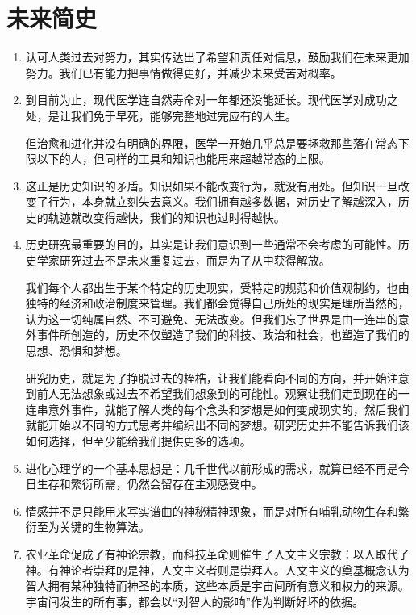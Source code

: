 \documentclass[UTF8]{ctexart}
\begin{document}
	\newpage
	
	\section{未来简史}
		
		\begin{enumerate}
			\item 认可人类过去对努力，其实传达出了希望和责任对信息，鼓励我们在未来更加努力。我们已有能力把事情做得更好，并减少未来受苦对概率。
			
			\item 到目前为止，现代医学连自然寿命对一年都还没能延长。现代医学对成功之处，是让我们免于早死，能够完整地过完应有的人生。
			
			但治愈和进化并没有明确的界限，医学一开始几乎总是要拯救那些落在常态下限以下的人，但同样的工具和知识也能用来超越常态的上限。
			
			\item  这正是历史知识的矛盾。知识如果不能改变行为，就没有用处。但知识一旦改变了行为，本身就立刻失去意义。我们拥有越多数据，对历史了解越深入，历史的轨迹就改变得越快，我们的知识也过时得越快。
			
			\item  历史研究最重要的目的，其实是让我们意识到一些通常不会考虑的可能性。历史学家研究过去不是未来重复过去，而是为了从中获得解放。
			
			我们每个人都出生于某个特定的历史现实，受特定的规范和价值观制约，也由独特的经济和政治制度来管理。我们都会觉得自己所处的现实是理所当然的，认为这一切纯属自然、不可避免、无法改变。但我们忘了世界是由一连串的意外事件所创造的，历史不仅塑造了我们的科技、政治和社会，也塑造了我们的思想、恐惧和梦想。
			
			研究历史，就是为了挣脱过去的桎梏，让我们能看向不同的方向，并开始注意到前人无法想象或过去不希望我们想象到的可能性。观察让我们走到现在的一连串意外事件，就能了解人类的每个念头和梦想是如何变成现实的，然后我们就能开始以不同的方式思考并编织出不同的梦想。研究历史并不能告诉我们该如何选择，但至少能给我们提供更多的选项。
			
			
			\item  进化心理学的一个基本思想是：几千世代以前形成的需求，就算已经不再是今日生存和繁衍所需，仍然会留存在主观感受中。
			
			\item  情感并不是只能用来写实谱曲的神秘精神现象，而是对所有哺乳动物生存和繁衍至为关键的生物算法。
			
			\item  农业革命促成了有神论宗教，而科技革命则催生了人文主义宗教：以人取代了神。有神论者崇拜的是神，人文主义者则是崇拜人。人文主义的奠基概念认为智人拥有某种独特而神圣的本质，这些本质是宇宙间所有意义和权力的来源。宇宙间发生的所有事，都会以“对智人的影响”作为判断好坏的依据。
			

\end{enumerate}
\end{document}
